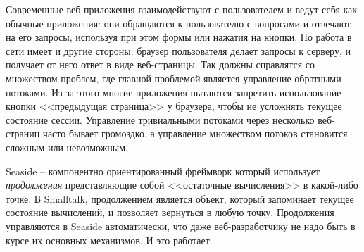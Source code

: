 \documentclass[a4paper,10pt,twoside]{book}
\begin{document}

Современные веб-приложения взаимодействуют с пользователем и ведут себя как обычные приложения:
они обращаются к пользователю с вопросами и отвечают на его запросы, используя при этом формы или нажатия на кнопки.
Но работа в сети имеет и другие стороны: браузер пользователя делает запросы к серверу, и получает от него ответ в виде веб-страницы.
Так  должны справлятся со множеством проблем,
где главной проблемой является управление обратными потоками.
Из-за этого многие приложения пытаются запретить использование кнопки <<предыдущая страница>> у браузера,
чтобы не усложнять текущее состояние сессии.
Управление тривиальными потоками через несколько веб-страниц часто бывает громоздко,
а управление множеством потоков становится сложным или невозможным.


Seaside -- компонентно ориентированный фреймворк который использует
\emph{продолжения} представляющие собой <<остаточные вычисления>> в какой-либо точке.
В Smalltalk, продолжением является объект, который запоминает текущее состояние вычислений,
и позволяет вернуться в любую точку. Продолжения управляются в Seaside автоматически,
что даже веб-разработчику не надо быть в курсе их основных механизмов. И это работает.
\end{document}

